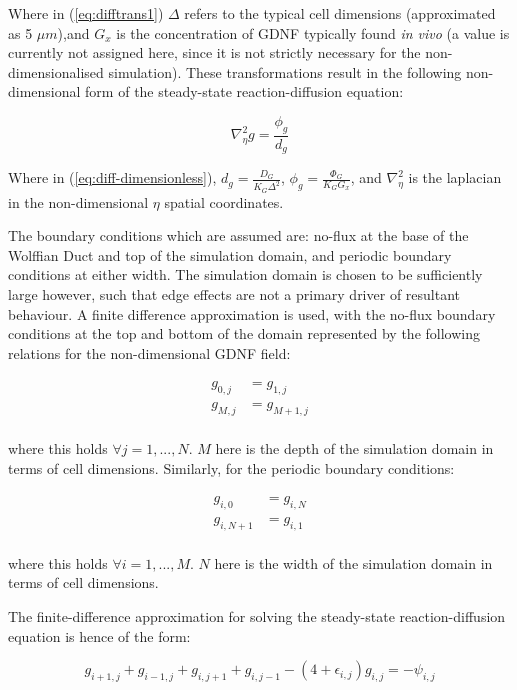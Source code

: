 \documentclass[pdftex,10pt,a4paper,twocolumn]{article}
\begin{document}
Where in (\ref{eq:difftrans1}) $\Delta$ refers to the typical cell dimensions (approximated as 5 $\mu m$),and $G_x$ is the concentration of GDNF typically found \textit{in vivo} (a value is currently not assigned here, since it is not strictly necessary for the non-dimensionalised simulation). These transformations result in the following non-dimensional form of the steady-state reaction-diffusion equation:

\begin{equation}\label{eq:diff-dimensionless}
\nabla_\eta^2 g = \frac{\phi_g}{d_g}
\end{equation}

Where in (\ref{eq:diff-dimensionless}), $d_g = \frac{D_G}{K_G \Delta^2}$, $\phi_g = \frac{\Phi_G}{K_G G_x}$, and $\nabla_\eta^2$ is the laplacian in the non-dimensional $\eta$ spatial coordinates.

The boundary conditions which are assumed are: no-flux at the base of the Wolffian Duct and top of the simulation domain, and periodic boundary conditions at either width. The simulation domain is chosen to be sufficiently large however, such that edge effects are not a primary driver of resultant behaviour. A finite difference approximation is used, with the no-flux boundary conditions at the top and bottom of the domain represented by the following relations for the non-dimensional GDNF field:

\begin{align*}
g_{0,j}& = g_{1,j}\\
g_{M,j}& = g_{M+1,j}\\
\end{align*}

where this holds $\forall j = 1,...,N$. $M$ here is the depth of the simulation domain in terms of cell dimensions. Similarly, for the periodic boundary conditions:

\begin{align*}
g_{i,0}& = g_{i,N}\\
g_{i,N+1}& = g_{i,1}\\
\end{align*}

where this holds $\forall i = 1,...,M$. $N$ here is the width of the simulation domain in terms of cell dimensions.

The finite-difference approximation for solving the steady-state reaction-diffusion equation is hence of the form:

\begin{equation}\label{eq:finitediff}
g_{i+1,j} + g_{i-1,j} + g_{i,j+1} + g_{i,j-1} - (4 + \epsilon_{i,j})g_{i,j} = -\psi_{i,j}
\end{equation}
\end{document}
